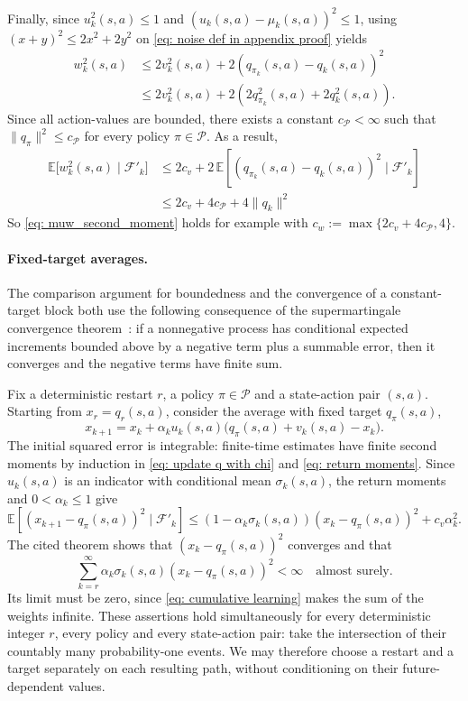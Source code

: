 \documentclass[twoside,11pt]{article}
\newcommand{\polset}{\mathcal{P}}
\DeclareRobustCommand{\reviewbarstart}{%
  \ifhmode %
    \vadjust{\vbox to 0pt{%
      \vskip-\ht\strutbox %
      \vskip-\dp\strutbox %
      \cbstart[\changebarwidth] %
      \vss %
    }}%
  \else %
    \cbstart[\changebarwidth]%
  \fi %
} %
\providecommand{\DIFadd}[1]{#1} %
\providecommand{\DIFaddbegin}{\reviewbarstart} %
\providecommand{\DIFaddend}{\protect\cbend} %
\def\DIFadd#1{#1}%
\def\DIFaddbegin{}%
\def\DIFaddend{}%
\begin{document}
Finally, since $u_k^2(s,a) \le 1$ and $(u_k(s,a) - \mu_k(s,a))^2 \le 1$,
using $(x+y)^2 \le 2 x^2 + 2 y^2$ on \eqref{eq: noise def in appendix proof} yields
\begin{align*}
w_k^2(s,a)
&\le 2 v_k^2(s,a) + 2 (q_{\pi_k}(s,a)-q_k(s,a) )^2
\\
&\le 2 v_k^2(s,a) + 2 ( 2 q_{\pi_k}^2(s,a) + 2 q_k^2(s,a) ) .
\end{align*}
Since all action-values are bounded,
there exists a constant $c_\polset < \infty$ such that $\|q_\pi\|^2 \leq c_\polset$ for every policy $\pi \in \polset$. As a result,
 \DIFaddbegin \begin{align*}
\DIFadd{\mathbb E \!\big[ w_{k}^2(s,a) \mid \mathcal F'_k \big]
}&\DIFadd{\le
2 c_v + 2 \, \mathbb E \!\left[ ( q_{\pi_k}(s,a)-q_k(s,a) )^2 \mid \mathcal F'_k \right]
}\\
&\DIFadd{\le
2 c_v + 4 c_\polset + 4 \|q_k\|^2
}\end{align*}\DIFaddend 
So \eqref{eq: muw_second_moment} holds for example with $c_w := \max \{ 2 c_v + 4 c_\polset, 4\}$.
\hfill \BlackBox

\paragraph{ \DIFaddbegin \DIFadd{Fixed-target averages.}\DIFaddend }
\DIFaddbegin \label{app: fixed target averages}
\DIFadd{The comparison argument for boundedness and the convergence of a constant-target block both use the following consequence of the supermartingale convergence theorem~\citep[Proposition~4.2]{Bertsekas1996Neuro-DynamicProgramming}: if a nonnegative process has conditional expected increments bounded above by a negative term plus a summable error, then it converges and the negative terms have finite sum.
}\DIFaddend 

 \DIFaddbegin \DIFadd{Fix a deterministic restart $r$, a policy $\pi\in\mathcal P$ and a state-action pair $(s,a)$.
Starting from $x_r=q_r(s,a)$, consider the average with fixed target $q_\pi(s,a)$,
}\[
\DIFadd{x_{k+1}=x_k+\alpha_k u_k(s,a)\big(q_\pi(s,a)+v_k(s,a)-x_k\big).
}\]
\DIFadd{The initial squared error is integrable: finite-time estimates have finite second moments by induction in \eqref{eq: update q with chi} and \eqref{eq: return moments}.
Since $u_k(s,a)$ is an indicator with conditional mean $\sigma_k(s,a)$, the return moments and $0<\alpha_k\le1$ give
}\[
\DIFadd{\mathbb E\!\left[(x_{k+1}-q_\pi(s,a))^2\mid\mathcal F'_k\right]
\le (1-\alpha_k\sigma_k(s,a))(x_k-q_\pi(s,a))^2+c_v\alpha_k^2.
}\]
\DIFadd{The cited theorem shows that $(x_k-q_\pi(s,a))^2$ converges and that
}\[
\DIFadd{\sum_{k=r}^{\infty}\alpha_k\sigma_k(s,a)(x_k-q_\pi(s,a))^2<\infty
\quad\text{almost surely}.
}\]
\DIFadd{Its limit must be zero, since \eqref{eq: cumulative learning} makes the sum of the weights infinite.
These assertions hold simultaneously for every deterministic integer $r$, every policy and every state-action pair: take the intersection of their countably many probability-one events. We may therefore choose a restart and a target separately on each resulting path, without conditioning on their future-dependent values.
}\DIFaddend 
\end{document}
